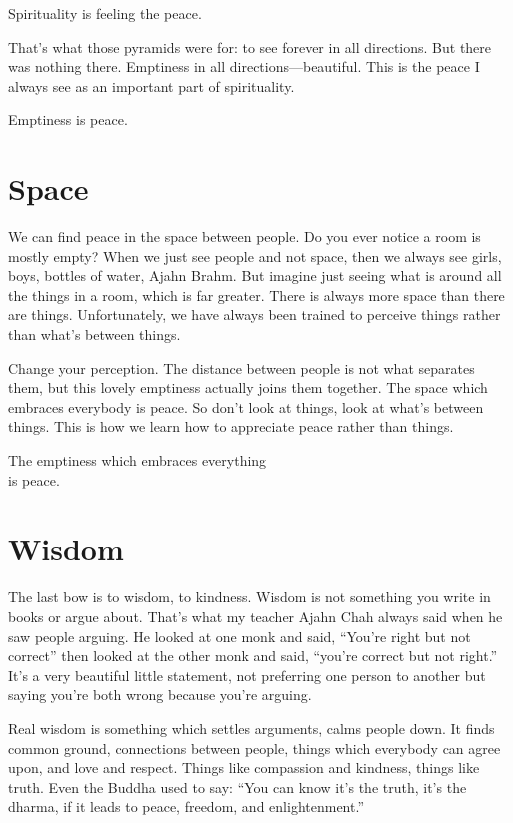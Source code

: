 \documentclass[12pt, openany]{book}
\newenvironment{aphorism}%
{%
\begin{center}\begin{itshape}
}%
{\end{itshape}\end{center}
}%
\begin{document}
\begin{aphorism}
Spirituality is feeling the peace.
\end{aphorism}

That’s what those pyramids were for: to see forever in all directions. But there was nothing there. Emptiness in all directions—beautiful. This is the peace I always see as an important part of spirituality. 

\begin{aphorism}
Emptiness is peace.
\end{aphorism}

\section*{Space}

We can find peace in the space between people. Do you ever notice a room is mostly empty? When we just see people and not space, then we always see girls, boys, bottles of water, Ajahn Brahm. But imagine just seeing what is around all the things in a room, which is far greater. There is always more space than there are things. Unfortunately, we have always been trained to perceive things rather than what’s between things. 

Change your perception. The distance between people is not what separates them, but this lovely emptiness actually joins them together. The space which embraces everybody is peace. So don’t look at things, look at what’s between things. This is how we learn how to appreciate peace rather than things. 

\begin{aphorism}
The emptiness which embraces everything\\  
is peace.
\end{aphorism}

\section*{Wisdom}

The last bow is to wisdom, to kindness. Wisdom is not something you write in books or argue about. That’s what my teacher Ajahn Chah always said when he saw people arguing. He looked at one monk and said, “You’re right but not correct” then looked at the other monk and said, “you’re correct but not right.” It’s a very beautiful little statement, not preferring one person to another but saying you’re both wrong because you’re arguing. 

Real wisdom is something which settles arguments, calms people down. It finds common ground, connections between people, things which everybody can agree upon, and love and respect. Things like compassion and kindness, things like truth. Even the Buddha used to say: “You can know it’s the truth, it’s the dharma, if it leads to peace, freedom, and enlightenment.” 
\end{document}
